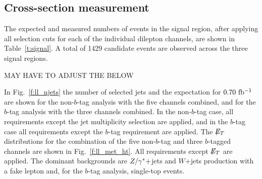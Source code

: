 

\subsection{Cross-section measurement}
\label{s:nobtagging}


The expected and measured numbers of events in the signal region,
after applying all selection cuts for each of the individual
dilepton channels, are shown in Table~\ref{t:signal}. A total of
1429 %
candidate events are observed across the three signal regions.



MAY HAVE TO ADJUST THE BELOW

In Fig.~\ref{f:ll_njets} the number of selected jets and the
expectation for $\mbox{0.70~fb$^{-1}$}$ are shown for the non-$b$-tag analysis
with the five channels combined, and for the $b$-tag analysis with
the three channels combined. In the non-$b$-tag case, all
requirements except the jet multiplicity selection are applied, and
in the $b$-tag case all requirements except the $b$-tag requirement
are applied. The $\not\!\!{E_{T}}$ distributions for the combination of the
five non-$b$-tag and three $b$-tagged channels are
shown in Fig.~\ref{f:ll_met_ht}. All requirements except $\not\!\!{E_{T}}$ are
applied.
The dominant backgrounds are $Z/\gamma^{*} +$jets and $W$+jets
production with a fake lepton and, for the $b$-tag analysis,
single-top events.

\begin{figure*}
  \centering
  \caption{ (a) Jet multiplicity distribution for
    $ee$+$\mu\mu$+$e\mu$+$e$TL+$\mu$TL events without a $b$-tagging requirement. (b)
    Multiplicity distribution of $b$-tagged jets in the $ee$+$\mu\mu$+$e\mu$ channels. Contributions from diboson and
    single top-quark events are summarized as `Other EW'. The
    events in (b) are not a simple subset of those in (a) because the
    event selections for the $b$-tag and non-$b$-tag analyses differ.
    Uncertainties shown are statistical and systematic combined. The
    distributions are shown as stacked histograms.}
  \label{f:ll_njets}
\end{figure*}

